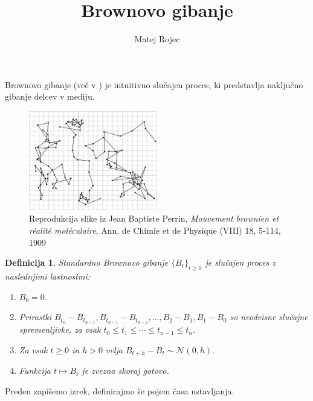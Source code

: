 \documentclass[11pt]{article}
\title{Brownovo gibanje}
\author{Matej Rojec}
\date{}
\newtheorem{definicija}{Definicija}
\begin{document}
\maketitle

Brownovo gibanje (več v \cite{karatzas1991brownian}) je intuitivno slučajen proces, %
ki predstavlja naključno gibanje delcev v mediju.
    

\begin{figure}[h!]
    \centering
    \includegraphics[width=0.50\textwidth]{PerrinPlot2.pdf}
    \caption{Reprodukcija slike iz Jean Baptiste Perrin, \emph{Mouvement brownien et réalité moléculaire}, Ann. de Chimie et de Physique (VIII) 18, 5-114, 1909}
\end{figure}


    \begin{definicija}
        Standardno Brownovo gibanje $\{B_t\}_{t \geq 0}$ je slučajen proces z naslednjimi lastnostmi: 
        \begin{enumerate}
            \item $B_0 = 0$.
            \item Prirastki $B_{t_n} - B_{t_{n-1}}, B_{t_{n-1}} - B_{t_{n-2}}, \ldots, B_2 - B_1, B_1 - B_0$ so neodvisne slučajne spremenljivke, za vsak $t_0 \leq t_1 \leq \cdots \leq t_{n-1} \leq t_n$.
            \item Za vsak $t \geq 0$ in $h > 0$ velja $B_{t+h} - B_t \sim \mathcal{N}(0, h)$.
            \item Funkcija $t \mapsto B_t$ je zvezna skoraj gotovo.
        \end{enumerate}
    \end{definicija}
    
    Preden zapišemo izrek, definirajmo še pojem časa ustavljanja.
    
\end{document}
